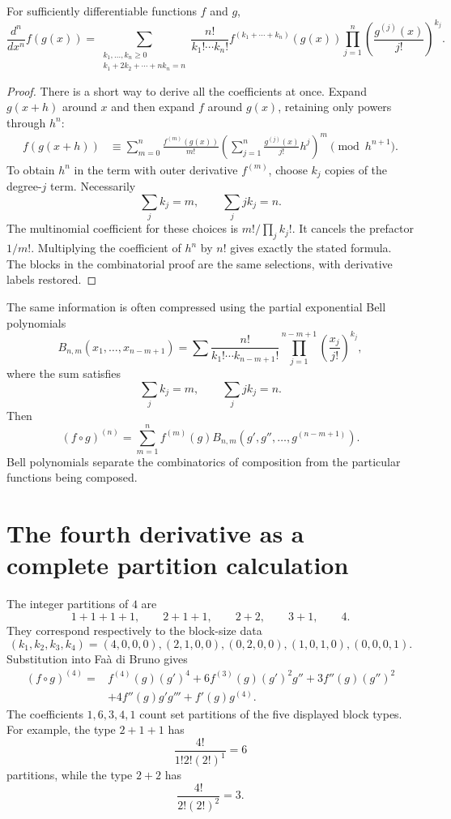 \begin{theorem}
For sufficiently differentiable functions \(f\) and \(g\),
\[
  \frac{d^n}{dx^n}f(g(x))
  =\sum_{\substack{k_1,\ldots,k_n\geq0\\
                    k_1+2k_2+\cdots+nk_n=n}}
  \frac{n!}{k_1!\cdots k_n!}
  f^{(k_1+\cdots+k_n)}(g(x))
  \prod_{j=1}^{n}
  \left(\frac{g^{(j)}(x)}{j!}\right)^{k_j}.
\]
\end{theorem}


\begin{proof}
There is a short way to derive all the coefficients at once. Expand $g(x+h)$ around $x$ and then expand $f$ around $g(x)$, retaining only powers through $h^n$:
\[
\begin{aligned}
 f(g(x+h))
 &\equiv \sum_{m=0}^{n}\frac{f^{(m)}(g(x))}{m!}
 \left(\sum_{j=1}^{n}\frac{g^{(j)}(x)}{j!}h^j\right)^m
 \pmod{h^{n+1}}.
\end{aligned}
\]
To obtain $h^n$ in the term with outer derivative $f^{(m)}$, choose $k_j$ copies of the degree-$j$ term. Necessarily
\[
 \sum_j k_j=m,\qquad \sum_j j k_j=n.
\]
The multinomial coefficient for these choices is $m!/\prod_j k_j!$. It cancels the prefactor $1/m!$. Multiplying the coefficient of $h^n$ by $n!$ gives exactly the stated formula. The blocks in the combinatorial proof are the same selections, with derivative labels restored.
\end{proof}

The same information is often compressed using the partial exponential Bell polynomials
\[
  B_{n,m}(x_1,\ldots,x_{n-m+1})
  =\sum
  \frac{n!}{k_1!\cdots k_{n-m+1}!}
  \prod_{j=1}^{n-m+1}\left(\frac{x_j}{j!}\right)^{k_j},
\]
where the sum satisfies
\[
  \sum_j k_j=m,
  \qquad
  \sum_j j k_j=n.
\]
Then
\[
  (f\circ g)^{(n)}
  =\sum_{m=1}^{n}f^{(m)}(g)
   B_{n,m}(g',g'',\ldots,g^{(n-m+1)}).
\]
Bell polynomials separate the combinatorics of composition from the particular functions being composed.

\section{The fourth derivative as a complete partition calculation}

The integer partitions of \(4\) are
\[
  1+1+1+1,\qquad
  2+1+1,\qquad
  2+2,\qquad
  3+1,\qquad
  4.
\]
They correspond respectively to the block-size data
\[
  (k_1,k_2,k_3,k_4)
  =(4,0,0,0),(2,1,0,0),(0,2,0,0),(1,0,1,0),(0,0,0,1).
\]
Substitution into Faà di Bruno gives
\[
\begin{aligned}
(f\circ g)^{(4)}={}&
 f^{(4)}(g)(g')^4
 +6f^{(3)}(g)(g')^2g''
 +3f''(g)(g'')^2\\
&+4f''(g)g'g'''
 +f'(g)g^{(4)}.
\end{aligned}
\]
The coefficients \(1,6,3,4,1\) count set partitions of the five displayed block types.  For example, the type \(2+1+1\) has
\[
  \frac{4!}{1!2!(2!)^1}=6
\]
partitions, while the type \(2+2\) has
\[
  \frac{4!}{2!(2!)^2}=3.
\]

